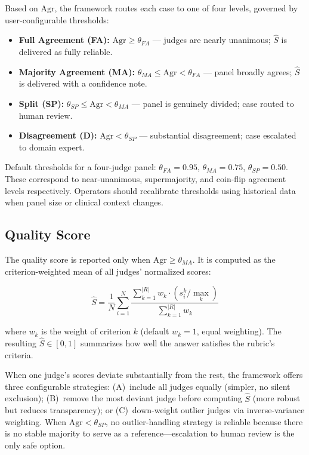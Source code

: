 \documentclass[conference]{IEEEtran}
\begin{document}
Based on $\mathrm{Agr}$, the framework routes each case to one of four
levels, governed by user-configurable thresholds:
\begin{itemize}
  \item \textbf{Full Agreement (FA):} $\mathrm{Agr} \geq \theta_{FA}$
        --- judges are nearly unanimous; $\hat{S}$ is delivered as
        fully reliable.
  \item \textbf{Majority Agreement (MA):} $\theta_{MA} \leq \mathrm{Agr}
        < \theta_{FA}$ --- panel broadly agrees; $\hat{S}$ is delivered
        with a confidence note.
  \item \textbf{Split (SP):} $\theta_{SP} \leq \mathrm{Agr} < \theta_{MA}$
        --- panel is genuinely divided; case routed to human review.
  \item \textbf{Disagreement (D):} $\mathrm{Agr} < \theta_{SP}$
        --- substantial disagreement; case escalated to domain expert.
\end{itemize}

Default thresholds for a four-judge panel: $\theta_{FA}=0.95$,
$\theta_{MA}=0.75$, $\theta_{SP}=0.50$. These correspond to near-unanimous,
supermajority, and coin-flip agreement levels respectively. Operators
should recalibrate thresholds using historical data when panel size
or clinical context changes.

\subsection{Quality Score}

The quality score is reported only when $\mathrm{Agr} \geq \theta_{MA}$.
It is computed as the criterion-weighted mean of all judges' normalized
scores:

\begin{equation}
\hat{S} = \frac{1}{N}\sum_{i=1}^{N}
\frac{\sum_{k=1}^{|R|} w_k \cdot (s_i^k / \max_k)}{\sum_{k=1}^{|R|} w_k}
\label{eq:score}
\end{equation}

\noindent where $w_k$ is the weight of criterion $k$ (default $w_k=1$,
equal weighting). The resulting $\hat{S} \in [0,1]$ summarizes how well
the answer satisfies the rubric's criteria.

When one judge's scores deviate substantially from the rest, the
framework offers three configurable strategies: (A)~include all judges
equally (simpler, no silent exclusion); (B)~remove the most deviant
judge before computing $\hat{S}$ (more robust but reduces transparency);
or (C)~down-weight outlier judges via inverse-variance weighting. When
$\mathrm{Agr} < \theta_{SP}$, no outlier-handling strategy is reliable
because there is no stable majority to serve as a reference---escalation
to human review is the only safe option.
\end{document}
